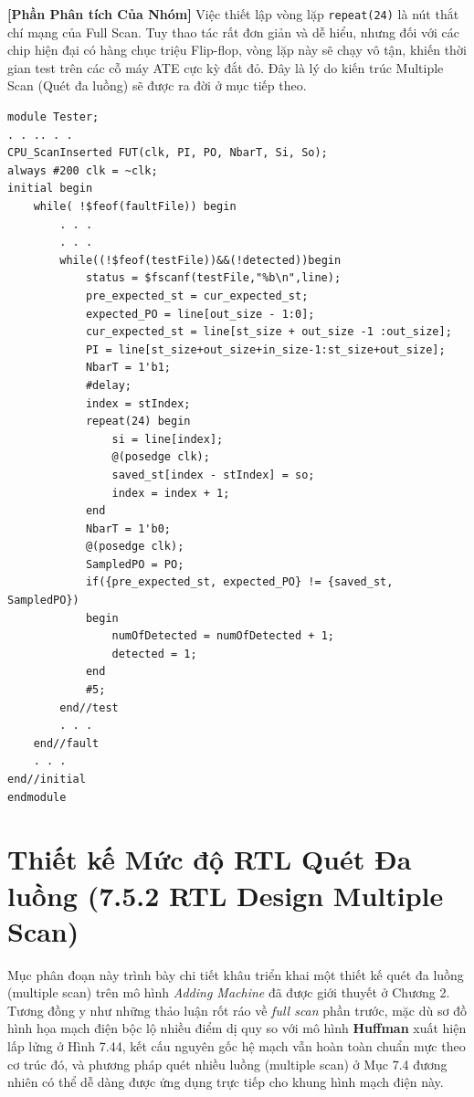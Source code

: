 \textbf{[Phần Phân tích Của Nhóm]} Việc thiết lập vòng lặp \texttt{repeat(24)} là nút thắt chí mạng của Full Scan. Tuy thao tác rất đơn giản và dễ hiểu, nhưng đối với các chip hiện đại có hàng chục triệu Flip-flop, vòng lặp này sẽ chạy vô tận, khiến thời gian test trên các cỗ máy ATE cực kỳ đắt đỏ. Đây là lý do kiến trúc Multiple Scan (Quét đa luồng) sẽ được ra đời ở mục tiếp theo.

\begin{lstlisting}[caption={Hình 7.53: Bộ tester ảo cho Full scan Adding Machine (Figure 7.53 Full scan Adding Machine virtual tester)}, label={lst:753}]
module Tester;
. . .. . .
CPU_ScanInserted FUT(clk, PI, PO, NbarT, Si, So);
always #200 clk = ~clk;
initial begin
    while( !$feof(faultFile)) begin
        . . .
        . . .
        while((!$feof(testFile))&&(!detected))begin
            status = $fscanf(testFile,"%b\n",line);
            pre_expected_st = cur_expected_st;
            expected_PO = line[out_size - 1:0];
            cur_expected_st = line[st_size + out_size -1 :out_size];
            PI = line[st_size+out_size+in_size-1:st_size+out_size];
            NbarT = 1'b1;
            #delay;
            index = stIndex;
            repeat(24) begin
                si = line[index];
                @(posedge clk);
                saved_st[index - stIndex] = so;
                index = index + 1;
            end
            NbarT = 1'b0;
            @(posedge clk);
            SampledPO = PO;
            if({pre_expected_st, expected_PO} != {saved_st, SampledPO})
            begin
                numOfDetected = numOfDetected + 1;
                detected = 1;
            end
            #5;
        end//test
        . . .
    end//fault
    . . .
end//initial
endmodule
\end{lstlisting}

\section{Thiết kế Mức độ RTL Quét Đa luồng (7.5.2 RTL Design Multiple Scan)}
Mục phân đoạn này trình bày chi tiết khâu triển khai một thiết kế quét đa luồng (multiple scan) trên mô hình \textit{Adding Machine} đã được giới thuyết ở Chương 2. Tương đồng y như những thảo luận rốt ráo về \textit{full scan} phần trước, mặc dù sơ đồ hình họa mạch điện bộc lộ nhiều điểm dị quy so với mô hình \textbf{Huffman} xuất hiện lấp lửng ở Hình 7.44, kết cấu nguyên gốc hệ mạch vẫn hoàn toàn chuẩn mực theo cơ trúc đó, và phương pháp quét nhiều luồng (multiple scan) ở Mục 7.4 đương nhiên có thể dễ dàng được ứng dụng trực tiếp cho khung hình mạch điện này.

